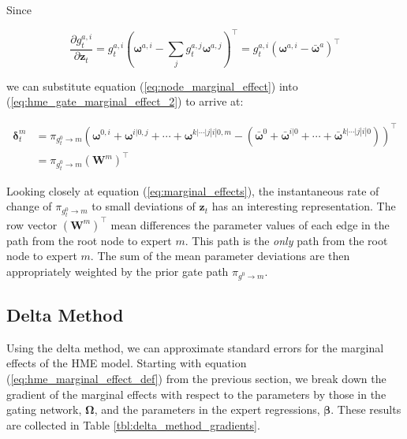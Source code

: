 \documentclass[12pt]{article}
\newcommand{\bw}[1]{\boldsymbol{\omega}^{#1}}
\newcommand{\mean}[1]{\bar{#1}}
\newcommand{\gateprod}[2]{\pi_{#1 \longrightarrow #2}}
\theoremstyle{definition}
\begin{document}
Since

\begin{equation} \label{eq:node_marginal_effect}
  \frac{\partial g^{a, i}_{t}}{\partial \boldsymbol{z}_{t}} = g^{a, i}_{t} \left( \bw{a, i} - \sum_{j} g^{a, j}_{t} \bw{a, j} \right)^{\top} = g^{a, i}_{t} \left( \bw{a, i} - \mean{\boldsymbol{\omega}}^{a} \right)^{\top}
\end{equation}

we can substitute equation (\ref{eq:node_marginal_effect}) into (\ref{eq:hme_gate_marginal_effect_2}) to arrive at:

\begin{equation} \label{eq:marginal_effects}
  \begin{split}
    \boldsymbol{\delta}^{m}_{t} &= \gateprod{g^{0}_{t}}{m} \left(\boldsymbol{\omega}^{0, i} + \boldsymbol{\omega}^{i|0, j} + \cdots + \boldsymbol{\omega}^{k|\cdots|j|i|0, m} - \left( \mean{\boldsymbol{\omega}}^{0} + \mean{\boldsymbol{\omega}}^{i|0} + \cdots + \mean{\boldsymbol{\omega}}^{k|\cdots|j|i|0} \right) \right)^{\top} \\
                                &= \gateprod{g^{0}_{t}}{m} ( \boldsymbol{W}^{m} )^{\top}
  \end{split}
\end{equation}

Looking closely at equation (\ref{eq:marginal_effects}), the instantaneous rate of change of $\gateprod{g^{0}_{t}}{m}$ to small deviations of $\boldsymbol{z}_{t}$ has an interesting representation. The row vector $( \boldsymbol{W}^{m} )^{\top}$ mean differences the parameter values of each edge in the path from the root node to expert $m$. This path is the \textit{only} path from the root node to expert $m$. The sum of the mean parameter deviations are then appropriately weighted by the prior gate path $\gateprod{g^{0}}{m}$.


\subsection{Delta Method}

Using the delta method, we can approximate standard errors for the marginal effects of the HME model. Starting with equation (\ref{eq:hme_marginal_effect_def}) from the previous section, we break down the gradient of the marginal effects with respect to the parameters by those in the gating network, $\boldsymbol{\Omega}$, and the parameters in the expert regressions, $\boldsymbol{\beta}$. These results are collected in Table \ref{tbl:delta_method_gradients}.
\end{document}
